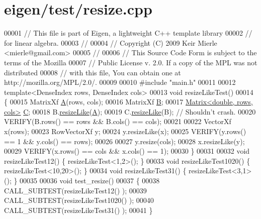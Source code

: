 \hypertarget{eigen_2test_2resize_8cpp_source}{}\section{eigen/test/resize.cpp}
\label{eigen_2test_2resize_8cpp_source}

\begin{DoxyCode}
00001 \textcolor{comment}{// This file is part of Eigen, a lightweight C++ template library}
00002 \textcolor{comment}{// for linear algebra.}
00003 \textcolor{comment}{//}
00004 \textcolor{comment}{// Copyright (C) 2009 Keir Mierle <mierle@gmail.com>}
00005 \textcolor{comment}{//}
00006 \textcolor{comment}{// This Source Code Form is subject to the terms of the Mozilla}
00007 \textcolor{comment}{// Public License v. 2.0. If a copy of the MPL was not distributed}
00008 \textcolor{comment}{// with this file, You can obtain one at http://mozilla.org/MPL/2.0/.}
00009 
00010 \textcolor{preprocessor}{#include "main.h"}
00011 
00012 \textcolor{keyword}{template}<DenseIndex rows, DenseIndex cols>
00013 \textcolor{keywordtype}{void} resizeLikeTest()
00014 \{
00015   MatrixXf \hyperlink{group___core___module_class_eigen_1_1_matrix}{A}(rows, cols);
00016   MatrixXf \hyperlink{group___core___module_class_eigen_1_1_matrix}{B};
00017   \hyperlink{group___core___module_class_eigen_1_1_matrix}{Matrix<double, rows, cols>} \hyperlink{group___core___module}{C};
00018   B.\hyperlink{class_eigen_1_1_plain_object_base_acc7200947e6399bee847ff37c8270fc8}{resizeLike}(\hyperlink{group___core___module_class_eigen_1_1_matrix}{A});
00019   C.\hyperlink{class_eigen_1_1_plain_object_base_acc7200947e6399bee847ff37c8270fc8}{resizeLike}(B);  \textcolor{comment}{// Shouldn't crash.}
00020   VERIFY(B.rows() == rows && B.cols() == cols);
00021 
00022   VectorXf x(rows);
00023   RowVectorXf y;
00024   y.resizeLike(x);
00025   VERIFY(y.rows() == 1 && y.cols() == rows);
00026 
00027   y.resize(cols);
00028   x.resizeLike(y);
00029   VERIFY(x.rows() == cols && x.cols() == 1);
00030 \}
00031 
00032 \textcolor{keywordtype}{void} resizeLikeTest12() \{ resizeLikeTest<1,2>(); \}
00033 \textcolor{keywordtype}{void} resizeLikeTest1020() \{ resizeLikeTest<10,20>(); \}
00034 \textcolor{keywordtype}{void} resizeLikeTest31() \{ resizeLikeTest<3,1>(); \}
00035 
00036 \textcolor{keywordtype}{void} test\_resize()
00037 \{
00038   CALL\_SUBTEST(resizeLikeTest12() );
00039   CALL\_SUBTEST(resizeLikeTest1020() );
00040   CALL\_SUBTEST(resizeLikeTest31() );
00041 \}
\end{DoxyCode}
